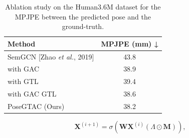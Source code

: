 \documentclass{article}
\begin{document}
\begin{table}[]
\centering
\begin{tabular}{l|c}
\hline
Method & MPJPE (mm) ↓\\
\hline
SemGCN [Zhao \textit{et al.}, 2019] & 43.8\\
with GAC & 38.9\\
with GTL & 39.4\\
with GAC GTL & 38.6\\
PoseGTAC (Ours) & 38.2\\
\hline
\end{tabular}
\caption{Ablation study on the Human3.6M dataset for the MPJPE between the predicted pose and the ground-truth.}
\end{table}


\begin{equation}
\textbf{X}^{(i+1)}=\sigma(\textbf{WX}^{(i)}(\Lambda \odot \textbf{M})),
\end{equation}

\medskip

\printbibliography
\end{document}
